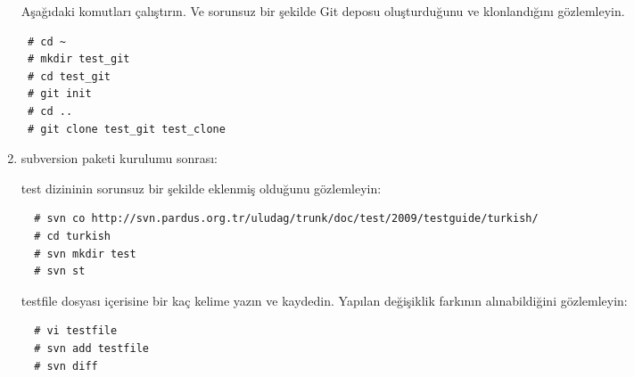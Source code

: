 \documentclass[a4paper,10pt]{article}
\begin{document}
\begin{enumerate}
Aşağıdaki komutları çalıştırın. Ve sorunsuz bir şekilde Git deposu oluşturduğunu ve klonlandığını gözlemleyin.
\begin{verbatim}
 # cd ~
 # mkdir test_git
 # cd test_git
 # git init
 # cd ..
 # git clone test_git test_clone
\end{verbatim}

\item subversion paketi kurulumu sonrası:

test dizininin sorunsuz bir şekilde eklenmiş olduğunu gözlemleyin:
\begin{verbatim}
  # svn co http://svn.pardus.org.tr/uludag/trunk/doc/test/2009/testguide/turkish/
  # cd turkish
  # svn mkdir test
  # svn st
 \end{verbatim}
testfile dosyası içerisine bir kaç kelime yazın ve kaydedin. Yapılan değişiklik farkının alınabildiğini gözlemleyin:
\begin{verbatim}
  # vi testfile
  # svn add testfile
  # svn diff
 \end{verbatim}
\end{enumerate}
\end{document}
